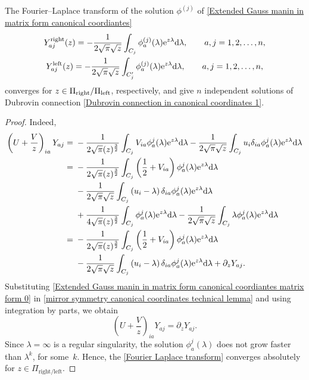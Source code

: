  \begin{Lemma}\label{Main lemma Mirror symmetry 1}
 The Fourier--Laplace transform of the solution $\phi^{(j)}$ of \eqref{Extended Gauss manin in matrix form canonical coordiantes}
\begin{gather}
Y^{\rm right}_{aj}(z)=-\frac{1}{2\sqrt{\pi}\sqrt{z}}\int_{C_j}\phi_a^{(j)}(\lambda){\rm e}^{z\lambda}{\rm d}\lambda, \qquad a,j=1,2,\dots,n,\nonumber\\
Y^{\rm left}_{aj}(z)=-\frac{1}{2\sqrt{\pi}\sqrt{z}}\int_{C_j^{\prime}}\phi_a^{(j)}(\lambda){\rm e}^{z\lambda}{\rm d}\lambda, \qquad a,j=1,2,\dots,n,\label{Fourier Laplace transform}
\end{gather}
converges for $z \in \Pi_{\rm right}/\Pi_{\rm left}$, respectively, and give $n$ independent solutions of Dubrovin connection \eqref{Dubrovin connection in canonical coordinates 1}.
\end{Lemma}

\begin{proof}
 Indeed,
\begin{align}
\left(U+\frac{V}{z}\right)_{ia}Y_{aj}={}&-\frac{1}{2\sqrt{\pi}(z)^{\frac{3}{2}}}\int_{C_j}V_{ia}\phi_a^{j}(\lambda){\rm e}^{z\lambda}{\rm d}\lambda-\frac{1}{2\sqrt{\pi}\sqrt{z}}\int_{C_j}u_i\delta_{ia}\phi_a^{j}(\lambda){\rm e}^{z\lambda}{\rm d}\lambda\nonumber\\
={}&-\frac{1}{2\sqrt{\pi}(z)^{\frac{3}{2}}}\int_{C_j}\left(\frac{1}{2}+V_{ia}\right)\phi_a^{j}(\lambda){\rm e}^{z\lambda}{\rm d}\lambda\nonumber\\
&-\frac{1}{2\sqrt{\pi}\sqrt{z}}\int_{C_j}\left(u_i-\lambda\right)\delta_{ia}\phi_a^{j}(\lambda){\rm e}^{z\lambda}{\rm d}\lambda\nonumber\\
&+\frac{1}{4\sqrt{\pi}(z)^{\frac{3}{2}}}\int_{C_j}\phi_a^{j}(\lambda){\rm e}^{z\lambda}{\rm d}\lambda-\frac{1}{2\sqrt{\pi}\sqrt{z}}\int_{C_j}\lambda\phi_a^{j}(\lambda){\rm e}^{z\lambda}{\rm d}\lambda\nonumber\\
={}&-\frac{1}{2\sqrt{\pi}(z)^{\frac{3}{2}}}\int_{C_j}\left(\frac{1}{2}+V_{ia}\right)\phi_a^{j}(\lambda){\rm e}^{z\lambda}{\rm d}\lambda\nonumber\\
&-\frac{1}{2\sqrt{\pi}\sqrt{z}}\int_{C_j}\left(u_i-\lambda\right)\delta_{ia}\phi_a^{j}(\lambda){\rm e}^{z\lambda}{\rm d}\lambda+\partial_zY_{aj}.\label{mirror symmetry canonical coordinates technical lemma}
\end{align}
Substituting \eqref{Extended Gauss manin in matrix form canonical coordiantes matrix form 0} in \eqref{mirror symmetry canonical coordinates technical lemma} and using integration by parts, we obtain
\[
\left(U+\frac{V}{z}\right)_{ia}Y_{aj}=\partial_zY_{aj}.
\]
Since $\lambda=\infty$ is a regular singularity, the solution $\phi_a^{j}(\lambda)$ does not grow faster than $\lambda^k$, for some~$k$. Hence, the \eqref{Fourier Laplace transform} converges absolutely for $z \in \Pi_{\text{right/left}}$.
\end{proof}


